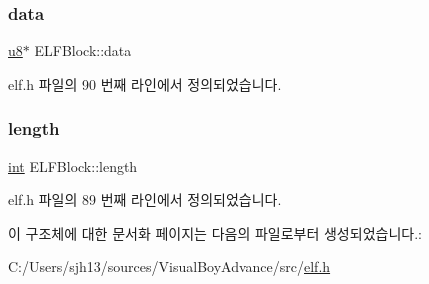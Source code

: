 \subsubsection{\texorpdfstring{data}{data}}
{\footnotesize\ttfamily \mbox{\hyperlink{_system_8h_aed742c436da53c1080638ce6ef7d13de}{u8}}$\ast$ E\+L\+F\+Block\+::data}



elf.\+h 파일의 90 번째 라인에서 정의되었습니다.

\mbox{\label{struct_e_l_f_block_ae79f929b79d2f694695b0633a55078de}} 
\subsubsection{\texorpdfstring{length}{length}}
{\footnotesize\ttfamily \mbox{\hyperlink{_util_8cpp_a0ef32aa8672df19503a49fab2d0c8071}{int}} E\+L\+F\+Block\+::length}



elf.\+h 파일의 89 번째 라인에서 정의되었습니다.



이 구조체에 대한 문서화 페이지는 다음의 파일로부터 생성되었습니다.\+:\begin{DoxyCompactItemize}
\item 
C\+:/\+Users/sjh13/sources/\+Visual\+Boy\+Advance/src/\mbox{\hyperlink{elf_8h}{elf.\+h}}\end{DoxyCompactItemize}
